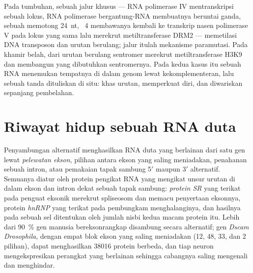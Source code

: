 \begin{proposition}\label{prop:b3:rna-regulation:rddm}
Pada tumbuhan, sebuah jalur khusus --- RNA polimerase IV mentranskripsi
sebuah lokus, RNA polimerase bergantung-RNA membuatnya beruntai ganda, sebuah
 memotong  \qty{24}{nt}, ~4 membawanya kembali ke
transkrip nasen polimerase V pada lokus yang sama lalu merekrut
metiltransferase DRM2 --- memetilasi DNA transposon dan urutan berulang;
jalur itulah mekanisme paramutasi. Pada khamir belah,  dari urutan
berulang sentromer merekrut metiltransferase H3K9 dan membangun 
yang dibutuhkan sentromernya. Pada kedua kasus itu sebuah RNA menemukan
tempatnya di dalam genom lewat kekomplementeran, lalu sebuah tanda 
dituliskan di situ: khas urutan, memperkuat diri, dan diwariskan sepanjang
pembelahan.
\end{proposition}

\section{Riwayat hidup sebuah RNA duta}

\begin{definition}\label{def:b3:rna-regulation:splicing}
%
Penyambungan alternatif menghasilkan RNA duta yang berlainan dari satu gen
lewat \emph{pelewatan ekson}, pilihan antara ekson yang saling meniadakan,
penahanan sebuah intron, atau pemakaian tapak sambung 5$'$ maupun 3$'$
alternatif. Semuanya diatur oleh protein pengikat RNA yang mengikat unsur
urutan di dalam ekson dan intron dekat sebuah tapak sambung: \emph{protein
SR} yang terikat pada penguat eksonik merekrut spliseosom dan memacu
penyertaan eksonnya, protein \emph{hnRNP} yang terikat pada pembungkam
menghalanginya, dan hasilnya pada sebuah sel ditentukan oleh jumlah nisbi
kedua macam protein itu. Lebih dari \qty{90}{\%} gen manusia bereksonrangkap
disambung secara alternatif; gen \emph{Dscam} \emph{Drosophila}, dengan
empat blok ekson yang saling meniadakan (12, 48, 33, dan 2 pilihan), dapat
menghasilkan \num{38016} protein berbeda, dan tiap neuron mengekspresikan
perangkat yang berlainan sehingga cabangnya saling mengenali dan menghindar.
\end{definition}

